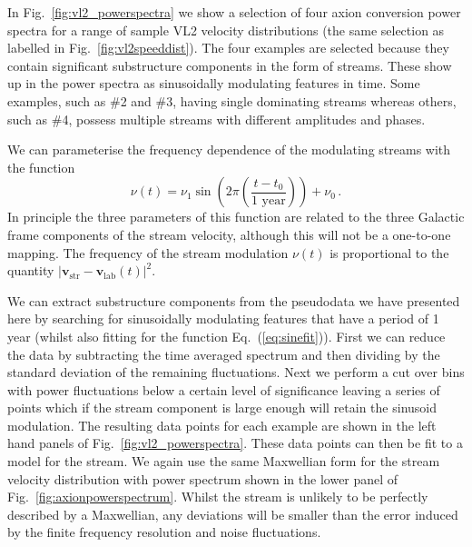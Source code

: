 In Fig.~\ref{fig:vl2_powerspectra} we show a selection of four axion conversion power spectra for a range of sample VL2 velocity distributions (the same selection as labelled in Fig.~\ref{fig:vl2speeddist}). The four examples are selected because they contain significant substructure components in the form of streams. These show up in the power spectra as sinusoidally modulating features in time. Some examples, such as \#2 and \#3, having single dominating streams whereas others, such as \#4, possess multiple streams with different amplitudes and phases. 

We can parameterise the frequency dependence of the modulating streams with the function
\begin{equation}\label{eq:sinefit}
\nu(t) = \nu_1 \sin\left(2\pi\left(\frac{t-t_0}{\textrm{1 year}}\right)\right) + \nu_0 \,.
\end{equation}
In principle the three parameters of this function are related to the three Galactic frame components of the stream velocity, although this will not be a one-to-one mapping. The frequency of the stream modulation $\nu(t)$ is proportional to the quantity $|\textbf{v}_\textrm{str}-\textbf{v}_\textrm{lab}(t)|^2$. 

We can extract substructure components from the pseudodata we have presented here by searching for sinusoidally modulating features that have a period of 1 year (whilst also fitting for the function Eq.~(\ref{eq:sinefit})). First we can reduce the data by subtracting the time averaged spectrum and then dividing by the standard deviation of the remaining fluctuations. Next we perform a cut over bins with power fluctuations below a certain level of significance leaving a series of points which if the stream component is large enough will retain the sinusoid modulation. The resulting data points for each example are shown in the left hand panels of Fig.~\ref{fig:vl2_powerspectra}. These data points can then be fit to a model for the stream. We again use the same Maxwellian form for the stream velocity distribution with power spectrum shown in the lower panel of Fig.~\ref{fig:axionpowerspectrum}. Whilst the stream is unlikely to be perfectly described by a Maxwellian, any deviations will be smaller than the error induced by the finite frequency resolution and noise fluctuations. 

